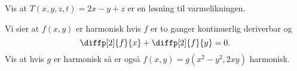 Vis at $T(x,y,z,t) = 2x - y + z$ er en løsning til varmelikningen.

\oppgave[V2012, Oppgave 4] Vi sier at $f(x,y)$ er harmonisk hvis $f$ er to
ganger kontinuerlig deriverbar og
%
\begin{equation*}
  \diffp[2]{f}{x} + \diffp[2]{f}{y} = 0.
\end{equation*}
%
Vis at hvis $g$ er harmonisk så er også $f(x,y) = g(x^2 - y^2, 2xy)$ harmonisk.

